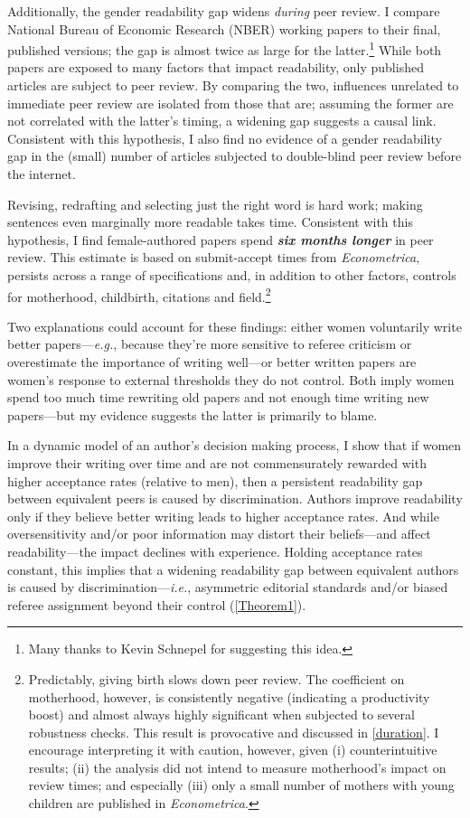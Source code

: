 Additionally, the gender readability gap widens \emph{during} peer review. I compare National Bureau of Economic Research (NBER) working papers to their final, published versions; the gap is almost twice as large for the latter.\footnote{Many thanks to Kevin Schnepel for suggesting this idea.} While both papers are exposed to many factors that impact readability, only published articles are subject to peer review. By comparing the two, influences unrelated to immediate peer review are isolated from those that are; assuming the former are not correlated with the latter's timing, a widening gap suggests a causal link. Consistent with this hypothesis, I also find no evidence of a gender readability gap in the (small) number of articles subjected to double-blind peer review before the internet.

Revising, redrafting and selecting just the right word is hard work; making sentences even marginally more readable takes time. Consistent with this hypothesis, I find female-authored papers spend \textbf{\emph{six months longer}} in peer review. This estimate is based on submit-accept times from \emph{Econometrica}, persists across a range of specifications and, in addition to other factors, controls for motherhood, childbirth, citations and field.\footnote{Predictably, giving birth slows down peer review. The coefficient on motherhood, however, is consistently negative (indicating a productivity boost) and almost always highly significant when subjected to several robustness checks. This result is provocative and discussed in \autoref{duration}. I encourage interpreting it with caution, however, given (i) counterintuitive results; (ii) the analysis did not intend to measure motherhood's impact on review times; and especially (iii) only a small number of mothers with young children are published in \emph{Econometrica}.}

Two explanations could account for these findings: either women voluntarily write better papers---\emph{e.g.}, because they're more sensitive to referee criticism or overestimate the importance of writing well---or better written papers are women's response to external thresholds they do not control. Both imply women spend too much time rewriting old papers and not enough time writing new papers---but my evidence suggests the latter is primarily to blame.

In a dynamic model of an author's decision making process, I show that if women improve their writing over time and are not commensurately rewarded with higher acceptance rates (relative to men), then a persistent readability gap between equivalent peers is caused by discrimination. Authors improve readability only if they believe better writing leads to higher acceptance rates. And while oversensitivity and\slash or poor information may distort their beliefs---and affect readability---the impact declines with experience. Holding acceptance rates constant, this implies that a widening readability gap between equivalent authors is caused by discrimination---\emph{i.e.}, asymmetric editorial standards and\slash or biased referee assignment beyond their control (\autoref{Theorem1}).


